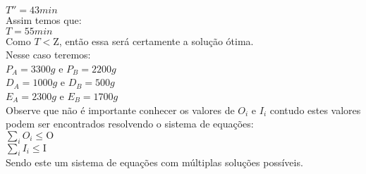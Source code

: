 \documentclass{book}
\begin{document}
$T'' = 43 min$ \\

Assim temos que: \\

$ T = 55 min$ \\

Como $T<\textrm{Z}$, então essa será certamente a solução ótima. \\

Nesse caso teremos: \\

$P_A = 3300g$ e $P_B=2200g$ \\

$D_A = 1000g$ e $D_B = 500g$ \\

$E_A = 2300g$ e $E_B = 1700g$ \\

Observe que não é importante conhecer os valores de $O_i$ e $I_i$ contudo estes valores podem ser encontrados resolvendo o sistema de equações: \\

$\sum_i{O_i} \leq \textrm{O}$ \\

$\sum_i{I_i} \leq \textrm{I}$ \\

Sendo este um sistema de equações com múltiplas soluções possíveis.


%
%




\end{document}
